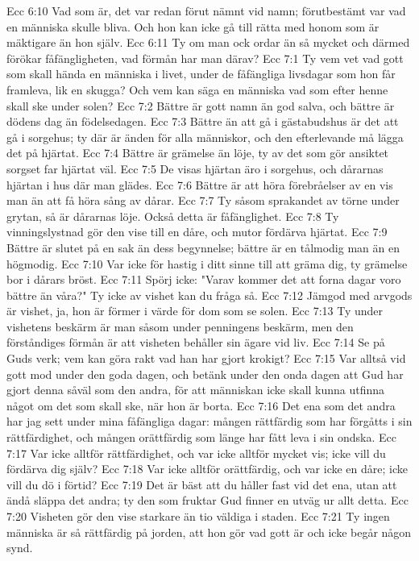 Ecc 6:10  Vad som är, det var redan förut nämnt vid namn; förutbestämt var vad en människa skulle bliva. Och hon kan icke gå till rätta med honom som är mäktigare än hon själv.
Ecc 6:11  Ty om man ock ordar än så mycket och därmed förökar fåfängligheten, vad förmån har man därav?
Ecc 7:1  Ty vem vet vad gott som skall hända en människa i livet, under de fåfängliga livsdagar som hon får framleva, lik en skugga? Och vem kan säga en människa vad som efter henne skall ske under solen?
Ecc 7:2  Bättre är gott namn än god salva, och bättre är dödens dag än födelsedagen.
Ecc 7:3  Bättre än att gå i gästabudshus är det att gå i sorgehus; ty där är änden för alla människor, och den efterlevande må lägga det på hjärtat.
Ecc 7:4  Bättre är grämelse än löje, ty av det som gör ansiktet sorgset far hjärtat väl.
Ecc 7:5  De visas hjärtan äro i sorgehus, och dårarnas hjärtan i hus där man glädes.
Ecc 7:6  Bättre är att höra förebråelser av en vis man än att få höra sång av dårar.
Ecc 7:7  Ty såsom sprakandet av törne under grytan, så är dårarnas löje. Också detta är fåfänglighet.
Ecc 7:8  Ty vinningslystnad gör den vise till en dåre, och mutor fördärva hjärtat.
Ecc 7:9  Bättre är slutet på en sak än dess begynnelse; bättre är en tålmodig man än en högmodig.
Ecc 7:10  Var icke för hastig i ditt sinne till att gräma dig, ty grämelse bor i dårars bröst.
Ecc 7:11  Spörj icke: "Varav kommer det att forna dagar voro bättre än våra?" Ty icke av vishet kan du fråga så.
Ecc 7:12  Jämgod med arvgods är vishet, ja, hon är förmer i värde för dom som se solen.
Ecc 7:13  Ty under vishetens beskärm är man såsom under penningens beskärm, men den förståndiges förmån är att visheten behåller sin ägare vid liv.
Ecc 7:14  Se på Guds verk; vem kan göra rakt vad han har gjort krokigt?
Ecc 7:15  Var alltså vid gott mod under den goda dagen, och betänk under den onda dagen att Gud har gjort denna såväl som den andra, för att människan icke skall kunna utfinna något om det som skall ske, när hon är borta.
Ecc 7:16  Det ena som det andra har jag sett under mina fåfängliga dagar: mången rättfärdig som har förgåtts i sin rättfärdighet, och mången orättfärdig som länge har fått leva i sin ondska.
Ecc 7:17  Var icke alltför rättfärdighet, och var icke alltför mycket vis; icke vill du fördärva dig själv?
Ecc 7:18  Var icke alltför orättfärdig, och var icke en dåre; icke vill du dö i förtid?
Ecc 7:19  Det är bäst att du håller fast vid det ena, utan att ändå släppa det andra; ty den som fruktar Gud finner en utväg ur allt detta.
Ecc 7:20  Visheten gör den vise starkare än tio väldiga i staden.
Ecc 7:21  Ty ingen människa är så rättfärdig på jorden, att hon gör vad gott är och icke begår någon synd.
